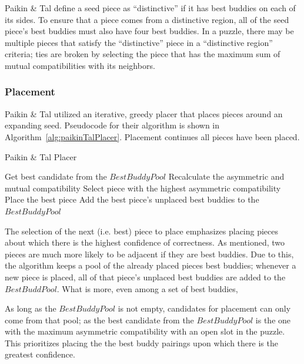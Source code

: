 \documentclass{report}
\begin{document}
Paikin \& Tal define a seed piece as ``distinctive'' if it has best buddies on each of its sides.  To ensure that a piece comes from a distinctive region, all of the seed piece's best buddies must also have four best buddies. In a puzzle, there may be multiple pieces that satisfy the ``distinctive'' piece in a ``distinctive region'' criteria; ties are broken by selecting the piece that has the maximum sum of mutual compatibilities with its neighbors.

\subsubsection{Placement}\label{sec:paikinTalPlacer}

Paikin \& Tal utilized an iterative, greedy placer that places pieces around an expanding seed.  Pseudocode for their algorithm is shown in Algorithm~\ref{alg:paikinTalPlacer}.  Placement continues all pieces have been placed.

\begin{algorithm}
\caption{Paikin \& Tal Placer}\label{alg:paikinTalPlacer}
\begin{algorithmic}[1]

      \State Get best candidate from the $BestBuddyPool$
   \Else
      \State Recalculate the asymmetric and mutual compatibility
      \State Select piece with the highest asymmetric compatibility
   \EndIf  
   \State Place the best piece
   \State Add the best piece's unplaced best buddies to the $BestBuddyPool$

\EndWhile
\end{algorithmic}
\end{algorithm}

The selection of the next (i.e. best) piece to place emphasizes placing pieces about which there is the highest confidence of correctness. As mentioned, two pieces are much more likely to be adjacent if they are best buddies.  Due to this, the algorithm keeps a pool of the already placed pieces best buddies; whenever a new piece is placed, all of that piece's unplaced best buddies are added to the $BestBuddPool$.  What is more, even among a set of best buddies, 

As long as the $BestBuddyPool$ is not empty, candidates for placement can only come from that pool; as the best candidate from the $BestBuddyPool$ is the one with the maximum asymmetric compatibility with an open slot in the puzzle.  This prioritizes placing the the best buddy pairings upon which there is the greatest confidence.
\end{document}
